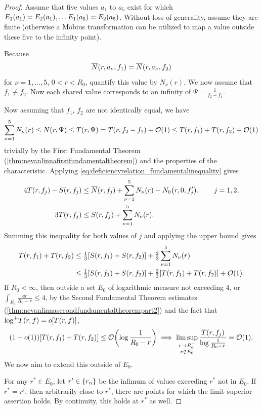 \begin{proof}
    Assume that five values \(a_1\) to \(a_5\) exist for which \(E_1\qty(a_1)=E_2\qty(a_1),\ldots E_1\qty(a_5)=E_2\qty(a_5)\). Without loss of generality, assume they are finite (otherwise a Möbius transformation can be utilized to map a value outside these five to the infinity point).

    Because \[\overline{N}\qty(r,a_\nu,f_1)=\overline{N}\qty(r,a_\nu,f_2)\] for \(\nu=1,\dots,5\), \(0<r<R_0\), quantify this value by \(N_\nu(r)\). We now assume that \(f_1\not\equiv f_2\). Now each shared value corresponds to an infinity of \(\Psi=\tfrac1{f_2-f_1}\).

    Now assuming that \(f_1\), \(f_2\) are not identically equal, we have \[\sum_{\nu=1}^5 N_\nu(r)\leq N(r,\Psi)\leq T(r,\Psi)=T(r,f_2-f_1)+\order{1}\leq T(r,f_1)+T(r,f_2)+\order{1}\] trivially by the First Fundamental Theorem (\cref{thm:nevanlinnafirstfundamentaltheorem}) and the properties of the characteristic. Applying \cref{eq:deficiencyrelation_fundamentalinequality} gives
    \begin{align*}
        4T\qty(r,f_j)-S\qty(r,f_j)&\leq\overline{N}\qty(r,f_j)+\sum_{\nu=1}^5N_\nu(r)-N_0\qty(r,0,f_j'),\qquad j=1,2,\\
        3T(r,f_j)&\leq S\qty(r,f_j)+\sum_{\nu=1}^5N_\nu(r).
    \end{align*}
    Summing this inequality for both values of \(j\) and applying the upper bound gives
    \begin{align*}
        T\qty(r,f_1)+T\qty(r,f_2)&\leq\tfrac13\qty[S\qty(r,f_1)+S\qty(r,f_2)]+\tfrac23\sum_{\nu=1}^5N_\nu(r)\\
        &\leq\tfrac13\qty[S\qty(r,f_1)+S\qty(r,f_2)]+\tfrac23\qty[T\qty(r,f_1)+T\qty(r,f_2)]+\order{1}.
    \end{align*}
    If \(R_0<\infty\), then outside a set \(E_0\) of logarithmic measure not exceeding 4, or \(\textstyle\int_{E_0}\frac{\dd{r}}{R_0-r}\leq 4\), by the Second Fundamental Theorem estimates (\cref{thm:nevanlinnasecondfundamentaltheorempart2}) and the fact that \(\mathop{\log^+\!} T(r,f)=o\qty[T(r,f)]\), \[\qty(1-o(1))\qty[T\qty(r,f_1)+T\qty(r,f_2)]\leq\order{\log\frac1{R_0-r}}\implies\limsup_{\substack{r\to R_0^-\\r\notin E_0}}\frac{T(r,f_j)}{\log\frac1{R_0-r}}=\order{1}.\]
    We now aim to extend this outside of \(E_0\).

    For any \(r^*\in E_0\), let \(r'\in\qty{r_n}\) be the infimum of values exceeding \(r^*\) not in \(E_0\). If \(r^*=r'\), then arbitrarily close to \(r^*\), there are points for which the limit superior assertion holds. By continuity, this holds at \(r^*\) as well.


\end{proof}
